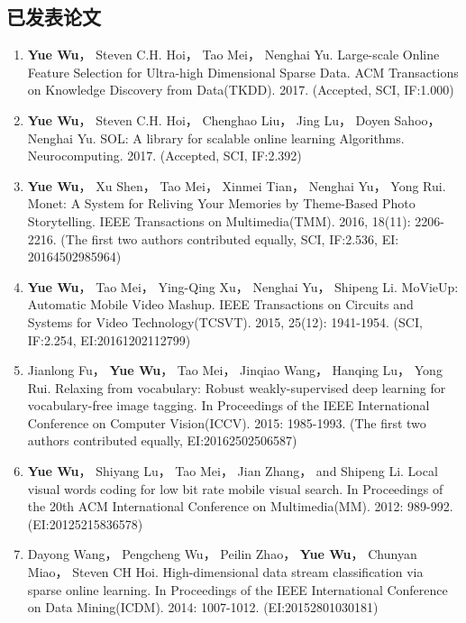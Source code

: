 \documentclass[doctor]{ustcthesis}
\begin{document}
\begin{publications}
    \section*{已发表论文}

    \begin{enumerate}
        \item \textbf{Yue Wu}， Steven C.H. Hoi， Tao Mei， Nenghai Yu.
            Large-scale Online Feature Selection for Ultra-high Dimensional Sparse
            Data. ACM Transactions on Knowledge Discovery from Data(TKDD).
            2017. (Accepted, SCI, IF:1.000)
        \item \textbf{Yue Wu}， Steven C.H. Hoi， Chenghao Liu， Jing Lu， Doyen Sahoo，
            Nenghai Yu. SOL: A library for scalable online learning
            Algorithms. Neurocomputing. 2017. (Accepted, SCI, IF:2.392)
        \item \textbf{Yue Wu}， Xu Shen， Tao Mei， Xinmei Tian， Nenghai Yu， Yong
            Rui. Monet: A System for Reliving Your Memories by Theme-Based Photo
            Storytelling. IEEE Transactions on Multimedia(TMM). 2016, 18(11):
            2206-2216.
            (The first two authors contributed equally, SCI, IF:2.536, EI: 20164502985964)
        \item \textbf{Yue Wu}， Tao Mei， Ying-Qing Xu， Nenghai Yu， Shipeng Li.
            MoVieUp: Automatic Mobile Video Mashup. IEEE Transactions on
            Circuits and Systems for Video Technology(TCSVT). 2015, 25(12): 1941-1954.
            (SCI, IF:2.254, EI:20161202112799)
        \item Jianlong Fu， \textbf{Yue Wu}， Tao Mei， Jinqiao Wang， Hanqing Lu，
            Yong Rui. Relaxing from vocabulary: Robust weakly-supervised deep
            learning for vocabulary-free image tagging. In Proceedings of the
            IEEE International Conference on Computer Vision(ICCV). 2015:
            1985-1993.
            (The first two authors contributed equally, EI:20162502506587)
        \item \textbf{Yue Wu}， Shiyang Lu， Tao Mei， Jian Zhang， and Shipeng Li.
            Local visual words coding for low bit rate mobile visual search. In Proceedings of
            the 20th ACM International Conference on Multimedia(MM). 2012: 989-992.
            (EI:20125215836578)
        \item Dayong Wang， Pengcheng Wu， Peilin Zhao， \textbf{Yue Wu}， Chunyan Miao，
            Steven CH Hoi. High-dimensional data stream classification via sparse
            online learning. In Proceedings of the IEEE International Conference on
            Data Mining(ICDM). 2014: 1007-1012.
            (EI:20152801030181)
    \end{enumerate}


\end{publications}
\end{document}
